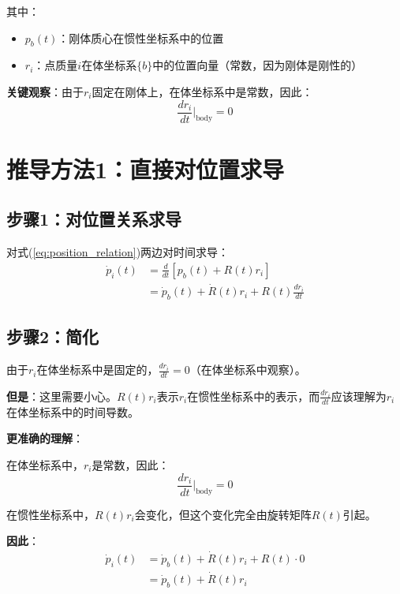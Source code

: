 \documentclass[12pt,a4paper]{article}
\begin{document}
其中：
\begin{itemize}
\item $p_b(t)$：刚体质心在惯性坐标系中的位置
\item $r_i$：点质量$i$在体坐标系$\{b\}$中的位置向量（常数，因为刚体是刚性的）
\end{itemize}

\textbf{关键观察}：由于$r_i$固定在刚体上，在体坐标系中是常数，因此：
\begin{equation}
\frac{dr_i}{dt}\Big|_{\text{body}} = 0
\end{equation}

\section{推导方法1：直接对位置求导}

\subsection{步骤1：对位置关系求导}

对式(\ref{eq:position_relation})两边对时间求导：
\begin{align}
\dot{p}_i(t) &= \frac{d}{dt}[p_b(t) + R(t) r_i] \\
&= \dot{p}_b(t) + \dot{R}(t) r_i + R(t) \frac{dr_i}{dt}
\label{eq:derivative_step1}
\end{align}

\subsection{步骤2：简化}

由于$r_i$在体坐标系中是固定的，$\frac{dr_i}{dt} = 0$（在体坐标系中观察）。

\textbf{但是}：这里需要小心。$R(t) r_i$表示$r_i$在惯性坐标系中的表示，而$\frac{dr_i}{dt}$应该理解为$r_i$在体坐标系中的时间导数。

\textbf{更准确的理解}：

在体坐标系中，$r_i$是常数，因此：
\begin{equation}
\frac{dr_i}{dt}\Big|_{\text{body}} = 0
\end{equation}

在惯性坐标系中，$R(t) r_i$会变化，但这个变化完全由旋转矩阵$R(t)$引起。

\textbf{因此}：
\begin{align}
\dot{p}_i(t) &= \dot{p}_b(t) + \dot{R}(t) r_i + R(t) \cdot 0 \\
&= \dot{p}_b(t) + \dot{R}(t) r_i
\label{eq:derivative_step2}
\end{align}
\end{document}
